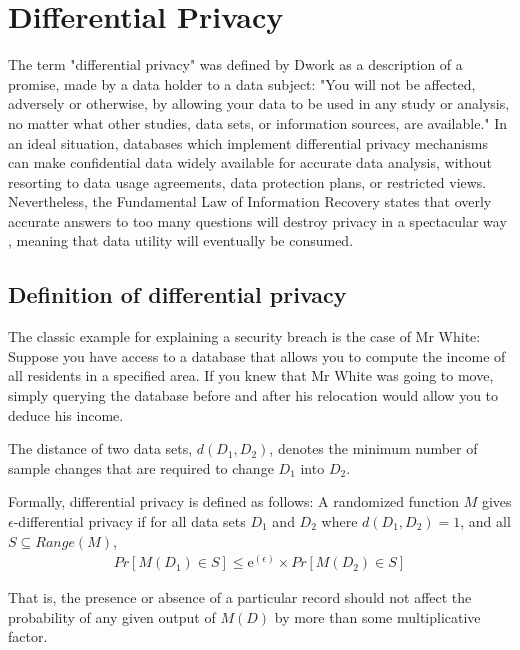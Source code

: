 \section{Differential Privacy}
\label{section:differential_privacy}
The term "differential privacy" was defined by Dwork as a description of a promise, made by a data holder to a data subject: "You will not be affected, adversely or otherwise, by allowing your data to be used in any study or analysis, no matter what other studies, data sets, or information sources, are available." \citep{dwork2013algorithmic}
In an ideal situation, databases which implement differential privacy mechanisms can make confidential data widely available for accurate data analysis, without resorting to data usage agreements, data protection plans, or restricted views. Nevertheless, the Fundamental Law of Information Recovery states that overly accurate answers to too many questions will destroy privacy in a spectacular way \citep{dwork2013algorithmic}, meaning that data utility will eventually be consumed.

\subsection{Definition of differential privacy}
The classic example for explaining a security breach is the case of Mr White: Suppose you have access to a database that allows you to compute the income of all residents in a specified area. If you knew that Mr White was going to move, simply querying the database before and after his relocation would allow you to deduce his income. 

\begin{definition} The distance of two data sets, $d(D_1, D_2)$, denotes the minimum number of sample changes that are required to change $D_1$ into $D_2$.
\end{definition}

Formally, differential privacy is defined as follows:
A randomized function $M$ gives $\epsilon$-differential privacy if for all data sets $D_1$ and $D_2$ where $d(D_1, D_2)=1$, and all $S\subseteq Range(M)$,
\begin{eqnarray} \label{DiffPrivDef}
 Pr[M(D_1)\in S]\leq \mathrm{e}^{(\epsilon)}\times Pr[M(D_2)\in S]
 \end{eqnarray}

That is, the presence or absence of a particular record should not affect the probability of any given output of $M(D)$ by more than some multiplicative factor. 

